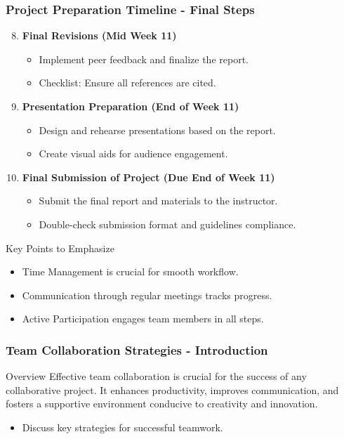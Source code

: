 \documentclass[aspectratio=169]{beamer}
\begin{document}
\begin{frame}[fragile]
    \frametitle{Project Preparation Timeline - Final Steps}
    \begin{enumerate}
        \setcounter{enumi}{7} %
        
        \item \textbf{Final Revisions (Mid Week 11)}
        \begin{itemize}
            \item Implement peer feedback and finalize the report.
            \item Checklist: Ensure all references are cited.
        \end{itemize}
        
        \item \textbf{Presentation Preparation (End of Week 11)}
        \begin{itemize}
            \item Design and rehearse presentations based on the report.
            \item Create visual aids for audience engagement.
        \end{itemize}
        
        \item \textbf{Final Submission of Project (Due End of Week 11)}
        \begin{itemize}
            \item Submit the final report and materials to the instructor.
            \item Double-check submission format and guidelines compliance.
        \end{itemize}
    \end{enumerate}
    
    \begin{block}{Key Points to Emphasize}
        \begin{itemize}
            \item Time Management is crucial for smooth workflow.
            \item Communication through regular meetings tracks progress.
            \item Active Participation engages team members in all steps.
        \end{itemize}
    \end{block}
\end{frame}

\begin{frame}[fragile]
    \frametitle{Team Collaboration Strategies - Introduction}
    \begin{block}{Overview}
        Effective team collaboration is crucial for the success of any collaborative project. It enhances productivity, improves communication, and fosters a supportive environment conducive to creativity and innovation. 
    \end{block}
    \begin{itemize}
        \item Discuss key strategies for successful teamwork.
    \end{itemize}
\end{frame}
\end{document}
